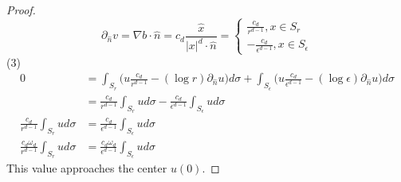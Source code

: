 \documentclass[12pt]{article}
\begin{document}
\begin{proof}
$$\partial_{\hat{n}} v = \nabla b \cdot \hat{n} = c_d \frac{\hat{x}}{\vert x \vert^d \cdot \hat{n}} =\begin{cases}
\frac{c_d}{r^{d-1}}, x \in S_r \\
-\frac{c_d}{\epsilon^{d-1}}, x \in S_\epsilon
\end{cases} $$
(3)
\begin{align*}
0&= \int_{S_r} \Big( u \frac{c_d}{r^{d-1}}-(\log r) \partial_{\hat{n}}u\Big) d\sigma + 
\int_{S_\epsilon} \Big( u \frac{c_d}{\epsilon^{d-1}}-(\log \epsilon) \partial_{\hat{n}}u\Big) d\sigma \\
&= \frac{c_d}{r^{d-1}}\int_{S_r} u d\sigma - \frac{c_d}{\epsilon^{d-1}}\int_{S_\epsilon} u d\sigma \\
\frac{c_d}{r^{d-1}}\int_{S_r} u d\sigma &= \frac{c_d}{\epsilon^{d-1}}\int_{S_\epsilon} u d\sigma \\
\frac{c_d\omega_d}{r^{d-1}}\int_{S_r} u d\sigma &= \frac{c_d\omega_d}{\epsilon^{d-1}}\int_{S_\epsilon} u d\sigma
\end{align*}
This value approaches the center $u(0)$.
\end{proof}
\end{document}
